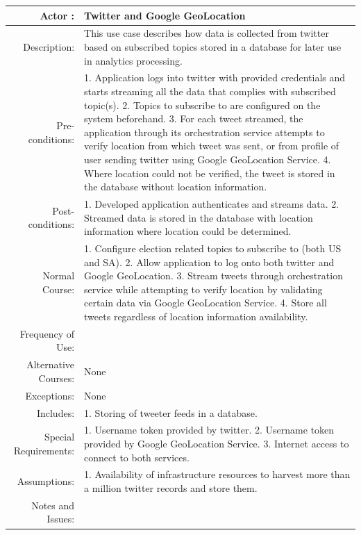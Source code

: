 \documentclass[12pt]{article} %
\begin{document}
	  \begin{center}
	  	\begin{tabular}{ | r | p{12cm} |}
	  		\hline
	  		Actor : & Twitter and Google GeoLocation \\
	  		\hline
	  		Description: & This use case describes how data is collected from twitter based on subscribed topics stored in a database for later use in analytics processing.\\
	  		\hline
	  		Pre-conditions: & 1.	Application logs into twitter with provided credentials and starts streaming all the data that complies with subscribed topic(s).
	  		2.	Topics to subscribe to are configured on the system beforehand.
	  		3.	For each tweet streamed, the application through its orchestration service attempts to verify location from which tweet was sent, or from profile of user sending twitter using Google GeoLocation Service.
	  		4.	Where location could not be verified, the tweet is stored in the database without location information.
	  		\\
	  		\hline
	  		Post-conditions: & 1.	Developed application authenticates and streams data.
	  		2.	Streamed data is stored in the database with location information where location could be determined.\\
	  		\hline
	  		Normal Course: & 1.	Configure election related topics to subscribe to (both US and SA).
	  		2.	Allow application to log onto both twitter and Google GeoLocation.
	  		3.	Stream tweets through orchestration service while attempting to verify location by validating certain data via Google GeoLocation Service.
	  		4.	Store all tweets regardless of location information availability.\\
	  		\hline
	  		Frequency of Use: & \\
	  		\hline
	  		Alternative Courses: & None\\
	  		\hline
	  		Exceptions: & None\\
	  		\hline
	  		Includes: & 1.	Storing of tweeter feeds in a database.\\
	  		\hline
	  		Special Requirements: & 1.	Username token provided by twitter.
	  		2.	Username token provided by Google GeoLocation Service.
	  		3.	Internet access to connect to both services.\\
	  		\hline
	  		Assumptions:& 1.	Availability of infrastructure resources to harvest more than a million twitter records and store them.\\
	  		\hline
	  		Notes and Issues: & \\
	  		\hline
	  	\end{tabular}
	  \end{center}
	
\end{document}
